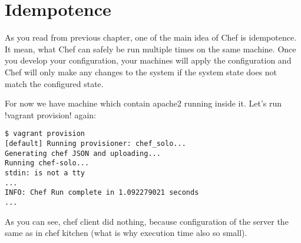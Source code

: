 \section{Idempotence}
\label{sec:solo-idempotence}

As you read from previous chapter, one of the main idea of Chef is idempotence. It mean, what Chef can safely be run multiple times on the same machine. Once you develop your configuration, your machines will apply the configuration and Chef will only make any changes to the system if the system state does not match the configured state.

For now we have machine which contain apache2 running inside it. Let's run \inline!vagrant provision! again:

\begin{lstlisting}[label=lst:my-cloud-idempotence1]
$ vagrant provision
[default] Running provisioner: chef_solo...
Generating chef JSON and uploading...
Running chef-solo...
stdin: is not a tty
...
INFO: Chef Run complete in 1.092279021 seconds
...
\end{lstlisting}

As you can see, chef client did nothing, because configuration of the server the same as in chef kitchen (what is why execution time also so small).
